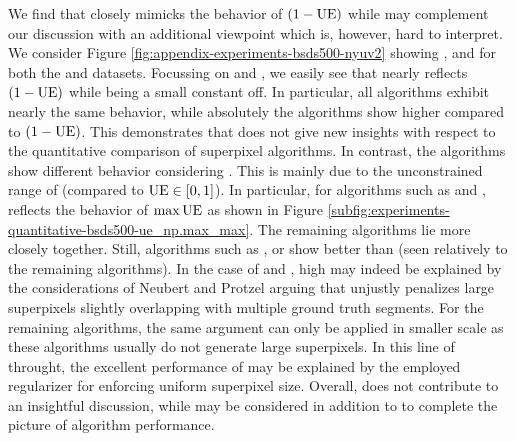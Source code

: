 We find that \ASA closely mimicks the behavior of $(1 - \text{UE})$ while \UEL may
complement our discussion with an additional viewpoint which is, however, hard to interpret.
We consider Figure \ref{fig:appendix-experiments-bsds500-nyuv2}
showing \UE, \ASA and \UEL for both the \BSDS and \NYU datasets. Focussing on \UE and
\ASA, we easily see that \ASA nearly reflects $(1 - \text{UE})$ while being a small
constant off. In particular, all algorithms exhibit nearly the same behavior,
while absolutely the algorithms show higher \ASA
compared to $(1 - \text{UE})$. This demonstrates that \ASA does not give new insights
with respect to the quantitative comparison of superpixel algorithms. In contrast,
the algorithms show different behavior considering \UEL. This is mainly due to the
unconstrained range of \UEL (compared to $\text{UE} \in [0,1]$). In particular,
for algorithms such as \EAMS and \FH, \UEL reflects the behavior of $\max\text{UE}$
as shown in Figure \ref{subfig:experiments-quantitative-bsds500-ue_np.max_max}.
The remaining algorithms lie more closely together.
Still, algorithms such as \ERS, \SEEDS or \PB show better \UEL than \UE (seen relatively to the remaining algorithms).
In the case of \EAMS and \FH, high \UEL may indeed
be explained by the considerations of Neubert and Protzel \cite{NeubertProtzel:2012}
arguing that \UEL unjustly penalizes large superpixels slightly overlapping with multiple ground truth segments.
For the remaining algorithms,
the same argument can only be applied in smaller scale as these algorithms usually
do not generate large superpixels. In this line of throught, the excellent
performance of \ERS may be explained by the employed regularizer for enforcing
uniform superpixel size. Overall, \ASA does not contribute to an insightful discussion,
while \UEL may be considered in addition to \UE to complete the picture of algorithm performance.
